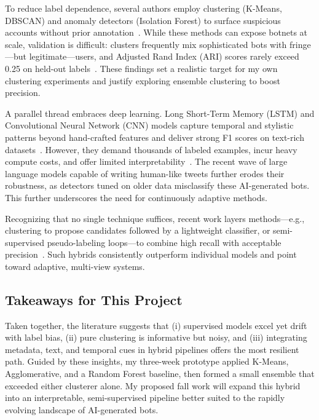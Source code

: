 \documentclass[10pt,twocolumn]{article}
\begin{document}
To reduce label dependence, several authors employ clustering (K-Means, DBSCAN) and anomaly detectors (Isolation Forest) to surface suspicious accounts without prior annotation~\cite{Grimme2018changing,Orabi2020detection}.  
While these methods can expose botnets at scale, validation is difficult: clusters frequently mix sophisticated bots with fringe—but legitimate—users, and Adjusted Rand Index (ARI) scores rarely exceed 0.25 on held-out labels~\cite{Yang2023anatomy}.  These findings set a realistic target for my own clustering experiments and justify exploring ensemble clustering to boost precision.

A parallel thread embraces deep learning. Long Short-Term Memory (LSTM) and Convolutional Neural Network (CNN) models capture temporal and stylistic patterns beyond hand-crafted features and deliver strong F1 scores on text-rich datasets~\cite{Cai2017behavior,Kudugunta2018deep}.  
However, they demand thousands of labeled examples, incur heavy compute costs, and offer limited interpretability~\cite{Wei2020twitter}.  The recent wave of large language models capable of writing human-like tweets further erodes their robustness, as detectors tuned on older data misclassify these AI-generated bots. This further underscores the need for continuously adaptive methods.

Recognizing that no single technique suffices, recent work layers methods—e.g., clustering to propose candidates followed by a lightweight classifier, or semi-supervised pseudo-labeling loops—to combine high recall with acceptable precision~\cite{Hayawi2023social,Mbona2023classifying}.  Such hybrids consistently outperform individual models and point toward adaptive, multi-view systems.

\subsection{Takeaways for This Project} 
Taken together, the literature suggests that (i) supervised models excel yet drift with label bias, (ii) pure clustering is informative but noisy, and (iii) integrating metadata, text, and temporal cues in hybrid pipelines offers the most resilient path.  
Guided by these insights, my three-week prototype applied K-Means, Agglomerative, and a Random Forest baseline, then formed a small ensemble that exceeded either clusterer alone.  My proposed fall work will expand this hybrid into an interpretable, semi-supervised pipeline better suited to the rapidly evolving landscape of AI-generated bots.
\end{document}
